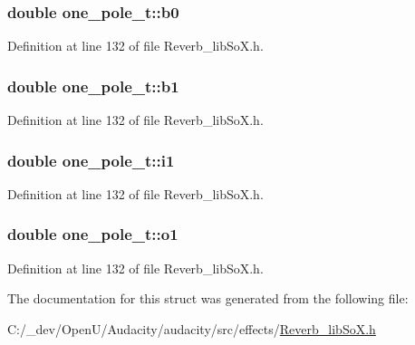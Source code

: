 \subsubsection[{\texorpdfstring{b0}{b0}}]{\setlength{\rightskip}{0pt plus 5cm}double one\+\_\+pole\+\_\+t\+::b0}\hypertarget{structone__pole__t_af4501cb928a4f905c2876da8e7e9bcc2}{}\label{structone__pole__t_af4501cb928a4f905c2876da8e7e9bcc2}


Definition at line 132 of file Reverb\+\_\+lib\+So\+X.\+h.

\subsubsection[{\texorpdfstring{b1}{b1}}]{\setlength{\rightskip}{0pt plus 5cm}double one\+\_\+pole\+\_\+t\+::b1}\hypertarget{structone__pole__t_a5cc580efdd88263e7c4ea25d60e27ec3}{}\label{structone__pole__t_a5cc580efdd88263e7c4ea25d60e27ec3}


Definition at line 132 of file Reverb\+\_\+lib\+So\+X.\+h.

\subsubsection[{\texorpdfstring{i1}{i1}}]{\setlength{\rightskip}{0pt plus 5cm}double one\+\_\+pole\+\_\+t\+::i1}\hypertarget{structone__pole__t_aaeb3c0fd9f16b5a4f682cd4ef1623313}{}\label{structone__pole__t_aaeb3c0fd9f16b5a4f682cd4ef1623313}


Definition at line 132 of file Reverb\+\_\+lib\+So\+X.\+h.

\subsubsection[{\texorpdfstring{o1}{o1}}]{\setlength{\rightskip}{0pt plus 5cm}double one\+\_\+pole\+\_\+t\+::o1}\hypertarget{structone__pole__t_a2497b72bb0c0600815e426b5ca2673e7}{}\label{structone__pole__t_a2497b72bb0c0600815e426b5ca2673e7}


Definition at line 132 of file Reverb\+\_\+lib\+So\+X.\+h.



The documentation for this struct was generated from the following file\+:\begin{DoxyCompactItemize}
\item 
C\+:/\+\_\+dev/\+Open\+U/\+Audacity/audacity/src/effects/\hyperlink{_reverb__lib_so_x_8h}{Reverb\+\_\+lib\+So\+X.\+h}\end{DoxyCompactItemize}
